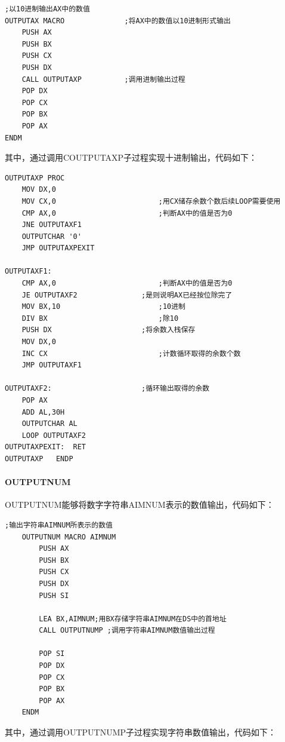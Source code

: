 \documentclass[UTF8,12pt]{article}
\begin{document}
\begin{lstlisting}[title=OUTPUTAX,frame=shadowbox]
    ;以10进制输出AX中的数值
OUTPUTAX MACRO				;将AX中的数值以10进制形式输出
	PUSH AX
	PUSH BX
	PUSH CX
	PUSH DX	
	CALL OUTPUTAXP			;调用进制输出过程	
	POP DX
	POP CX
	POP BX
	POP AX
ENDM
\end{lstlisting}

其中，通过调用COUTPUTAXP子过程实现十进制输出，代码如下：

\begin{lstlisting}[title=COUTPUTAXP,frame=shadowbox]
    OUTPUTAXP PROC
	MOV DX,0
	MOV CX,0						;用CX储存余数个数后续LOOP需要使用
	CMP AX,0						;判断AX中的值是否为0
	JNE	OUTPUTAXF1
	OUTPUTCHAR '0'
	JMP	OUTPUTAXPEXIT
		
OUTPUTAXF1:
	CMP AX,0						;判断AX中的值是否为0
	JE OUTPUTAXF2				;是则说明AX已经按位除完了
	MOV BX,10		   		 		;10进制
	DIV BX							;除10
	PUSH DX						;将余数入栈保存
	MOV DX,0
	INC CX							;计数循环取得的余数个数
	JMP OUTPUTAXF1
		
OUTPUTAXF2:						;循环输出取得的余数
	POP AX
	ADD AL,30H
	OUTPUTCHAR AL
    LOOP OUTPUTAXF2
OUTPUTAXPEXIT:  RET	
OUTPUTAXP	ENDP
\end{lstlisting}

\paragraph{OUTPUTNUM}
OUTPUTNUM能够将数字字符串AIMNUM表示的数值输出，代码如下：

\begin{lstlisting}[title=OUTPUTNUM,frame=shadowbox]
    ;输出字符串AIMNUM所表示的数值
    OUTPUTNUM MACRO AIMNUM
        PUSH AX
        PUSH BX
        PUSH CX
        PUSH DX
        PUSH SI
            
        LEA	BX,AIMNUM;用BX存储字符串AIMNUM在DS中的首地址	
        CALL OUTPUTNUMP	;调用字符串AIMNUM数值输出过程
            
        POP SI
        POP DX
        POP CX
        POP BX
        POP AX
    ENDM
\end{lstlisting}

其中，通过调用OUTPUTNUMP子过程实现字符串数值输出，代码如下：
\end{document}
